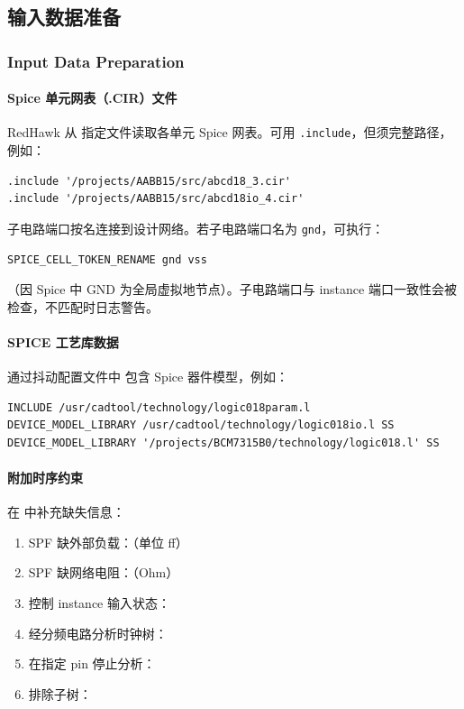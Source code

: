 \subsection{输入数据准备}
\subsubsection*{Input Data Preparation}

\paragraph{Spice 单元网表（.CIR）文件}
RedHawk 从  指定文件读取各单元 Spice 网表。可用 \texttt{.include}，但须完整路径，例如：
\begin{lstlisting}
.include '/projects/AABB15/src/abcd18_3.cir'
.include '/projects/AABB15/src/abcd18io_4.cir'
\end{lstlisting}
子电路端口按名连接到设计网络。若子电路端口名为 \texttt{gnd}，可执行：
\begin{lstlisting}
SPICE_CELL_TOKEN_RENAME gnd vss
\end{lstlisting}
（因 Spice 中 GND 为全局虚拟地节点）。子电路端口与 instance 端口一致性会被检查，不匹配时日志警告。

\paragraph{SPICE 工艺库数据}
通过抖动配置文件中  包含 Spice 器件模型，例如：
\begin{lstlisting}
INCLUDE /usr/cadtool/technology/logic018param.l
DEVICE_MODEL_LIBRARY /usr/cadtool/technology/logic018io.l SS
DEVICE_MODEL_LIBRARY '/projects/BCM7315B0/technology/logic018.l' SS
\end{lstlisting}

\paragraph{附加时序约束}
在  中补充缺失信息：
\begin{enumerate}
  \item SPF 缺外部负载：（单位 ff）
  \item SPF 缺网络电阻：（Ohm）
  \item 控制 instance 输入状态：
  \item 经分频电路分析时钟树：
  \item 在指定 pin 停止分析：
  \item 排除子树：
\end{enumerate}

